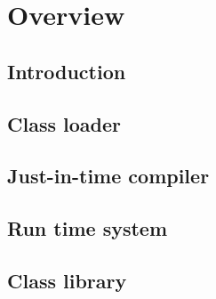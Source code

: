 \chapter{Overview}

\section{Introduction}

\section{Class loader}

\section{Just-in-time compiler}

\section{Run time system}

\section{Class library}
